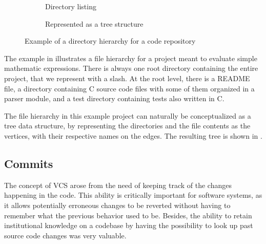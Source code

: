 \begin{figure}
    \centering
    \begin{subfigure}[b]{.40\textwidth}
        \caption{Directory listing}
        \label{fig:vcs-dir-flat}
    \end{subfigure}\hfill
    \begin{subfigure}[b]{.58\textwidth}
        \centering
        
        \caption{Represented as a tree structure}%
        \label{fig:vcs-dir-tree}
    \end{subfigure}
    \caption{Example of a directory hierarchy for a code repository}
    \label{fig:vcs-dir-project}
\end{figure}

The example in  illustrates a file hierarchy for a
project meant to evaluate simple mathematic expressions. There is always one
root directory containing the entire project, that we represent with a slash.
At the root level, there is a README file, a directory containing C
source code files with some of them organized in a parser module, and a test
directory containing tests also written in C.

The file hierarchy in this example project can naturally be conceptualized as a
tree data structure, by representing the directories and the file contents as
the vertices, with their respective names on the edges. The resulting tree is
shown in .

\subsection{Commits}

The concept of \acrlong{VCS} arose from the need of keeping track of the
changes happening in the code. This ability is critically important for
software systems, as it allows potentially erroneous changes to be reverted
without having to remember what the previous behavior used to be. Besides, the
ability to retain institutional knowledge on a codebase by having the
possibility to look up past source code changes was very valuable.

